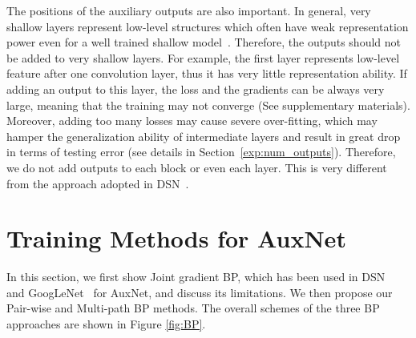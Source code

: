 \documentclass[10pt,onecolumn,letterpaper]{article}
\def\SexyName{AuxNet\xspace}
\begin{document}
The positions of the auxiliary outputs are also important. In general, very shallow layers represent low-level structures which often have weak representation power even for a well trained shallow model~\cite{zeiler2014visualizing}. Therefore, the outputs should not be added to very shallow layers. For example, the first layer represents low-level feature after one convolution layer, thus it has very little representation ability. If adding an output to this layer, the loss and the gradients can be always very large, meaning that the training may not converge (See supplementary materials). Moreover, adding too many losses may cause severe over-fitting, which may hamper the generalization ability of intermediate layers and result in great drop in terms of testing error (see details in Section~\ref{exp:num_outputs}). Therefore, we do not add outputs to each block or even each layer. This is very different from the approach adopted in DSN~\cite{Lee2015}.







\begin{figure*}[t]
\centering


\caption{Demonstration of three different BP methods for \SexyName. }\label{fig:BP}
\vspace{-1em}
\end{figure*}

\section{Training Methods for \SexyName} \label{sec:backpropagation}
In this section, we first show Joint gradient BP, which has been used in DSN~\cite{Lee2015} and GoogLeNet~\cite{szegedy2015going} for \SexyName, and discuss its limitations. We then propose our Pair-wise and Multi-path BP methods. The overall schemes of the three BP approaches are shown in Figure \ref{fig:BP}.
\end{document}
